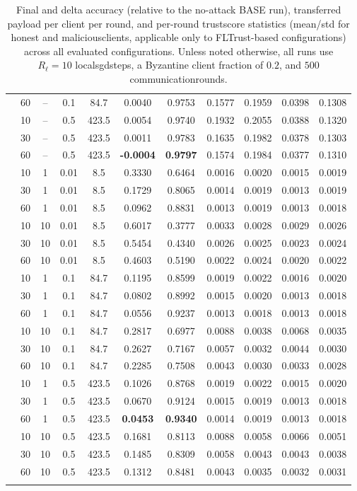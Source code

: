 \documentclass[11pt,twocolumn,a4paper,DIV=calc,parskip=half]{scrartcl}
\begin{document}
\begin{longtable}{@{}l c c c c c c c c c c@{}}
	& 60 & -- & 0.1 & 84.7 & 0.0040 & 0.9753 & 0.1577 & 0.1959 & 0.0398 & 0.1308 \\
	& 10 & -- & 0.5 & 423.5 & 0.0054 & 0.9740 & 0.1932 & 0.2055 & 0.0388 & 0.1320 \\
	& 30 & -- & 0.5 & 423.5 & 0.0011 & 0.9783 & 0.1635 & 0.1982 & 0.0378 & 0.1303 \\
	& 60 & -- & 0.5 & 423.5 & \textbf{-0.0004} & \textbf{0.9797} & 0.1574 & 0.1984 & 0.0377 & 0.1310 \\
	\arrayrulecolor{gray!60}\midrule\arrayrulecolor{black}
	\multirow{18}{*}{\textbf{ALL}} & 10 & 1 & 0.01 & 8.5 & 0.3330 & 0.6464 & 0.0016 & 0.0020 & 0.0015 & 0.0019 \\
	& 30 & 1 & 0.01 & 8.5 & 0.1729 & 0.8065 & 0.0014 & 0.0019 & 0.0013 & 0.0019 \\
	& 60 & 1 & 0.01 & 8.5 & 0.0962 & 0.8831 & 0.0013 & 0.0019 & 0.0013 & 0.0018 \\
	& 10 & 10 & 0.01 & 8.5 & 0.6017 & 0.3777 & 0.0033 & 0.0028 & 0.0029 & 0.0026 \\
	& 30 & 10 & 0.01 & 8.5 & 0.5454 & 0.4340 & 0.0026 & 0.0025 & 0.0023 & 0.0024 \\
	& 60 & 10 & 0.01 & 8.5 & 0.4603 & 0.5190 & 0.0022 & 0.0024 & 0.0020 & 0.0022 \\
	& 10 & 1 & 0.1 & 84.7 & 0.1195 & 0.8599 & 0.0019 & 0.0022 & 0.0016 & 0.0020 \\
	& 30 & 1 & 0.1 & 84.7 & 0.0802 & 0.8992 & 0.0015 & 0.0020 & 0.0013 & 0.0018 \\
	& 60 & 1 & 0.1 & 84.7 & 0.0556 & 0.9237 & 0.0013 & 0.0018 & 0.0013 & 0.0018 \\
	& 10 & 10 & 0.1 & 84.7 & 0.2817 & 0.6977 & 0.0088 & 0.0038 & 0.0068 & 0.0035 \\
	& 30 & 10 & 0.1 & 84.7 & 0.2627 & 0.7167 & 0.0057 & 0.0032 & 0.0044 & 0.0030 \\
	& 60 & 10 & 0.1 & 84.7 & 0.2285 & 0.7508 & 0.0043 & 0.0030 & 0.0033 & 0.0028 \\
	& 10 & 1 & 0.5 & 423.5 & 0.1026 & 0.8768 & 0.0019 & 0.0022 & 0.0015 & 0.0020 \\
	& 30 & 1 & 0.5 & 423.5 & 0.0670 & 0.9124 & 0.0015 & 0.0019 & 0.0013 & 0.0018 \\
	& 60 & 1 & 0.5 & 423.5 & \textbf{0.0453} & \textbf{0.9340} & 0.0014 & 0.0019 & 0.0013 & 0.0018 \\
	& 10 & 10 & 0.5 & 423.5 & 0.1681 & 0.8113 & 0.0088 & 0.0058 & 0.0066 & 0.0051 \\
	& 30 & 10 & 0.5 & 423.5 & 0.1485 & 0.8309 & 0.0058 & 0.0043 & 0.0043 & 0.0038 \\
	& 60 & 10 & 0.5 & 423.5 & 0.1312 & 0.8481 & 0.0043 & 0.0035 & 0.0032 & 0.0031 \\
	\caption{Final and delta accuracy (relative to the no-attack BASE run), transferred payload per client per round, and per-round \gls{trustscore} statistics (mean/std for honest and \glspl{maliciousclient}, applicable only to FLTrust-based configurations) across all evaluated configurations. Unless noted otherwise, all runs use $R_\ell=10$ \glspl{localsgdstep}, a Byzantine client fraction of $0.2$, and $500$ \glspl{communicationround}.}
	\label{tab:accuracy-summary_exp2}
\end{longtable}
\clearpage
\end{document}

